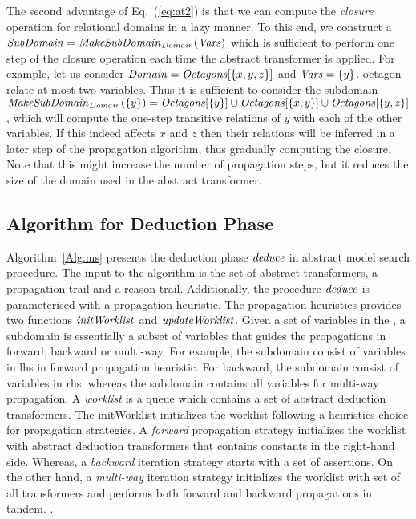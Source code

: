 The second advantage of Eq.~(\ref{eq:at2}) is that we can compute the
\emph{closure} operation for relational domains in a lazy manner. To
this end, we construct a $\mathit{SubDomain}=\mathit{MakeSubDomain}_{\mathit{Domain}}(\mathit{Vars})$
which is sufficient to perform one step of the closure operation each
time the abstract transformer is applied.
%
For example, let us consider $\mathit{Domain}=\mathit{Octagons}[\{x,y,z\}]$ and
$\mathit{Vars}=\{y\}$.  octagon  relate at 
most two variables. Thus it is sufficient to consider the subdomain
$\mathit{MakeSubDomain}_{\mathit{Domain}}(\{y\})=\mathit{Octagons}[\{y\}]\cup\mathit{Octagons}[\{x,y\}]\cup\mathit{Octagons}[\{y,z\}]$,
which will compute the one-step transitive relations of $y$ with each
of the other variables. If this indeed affects $x$ and $z$ then their
relations will be inferred in a later step of the propagation
algorithm, thus gradually computing the closure. Note that this might
increase the number of propagation steps, but it reduces the size of
the domain used in the abstract transformer.


\subsection{Algorithm for Deduction Phase}
%

Algorithm~\ref{Alg:ms} presents the deduction phase $\mathit{deduce}$ in 
abstract model search procedure.  The input to the algorithm is 
the set of abstract transformers, a propagation trail and a reason 
trail.  Additionally, the procedure $\mathit{deduce}$ is parameterised with 
a propagation heuristic.  The propagation heuristics provides two 
functions $\mathit{initWorklist}$ and $\mathit{updateWorklist}$.  Given a set of 
variables in the , a subdomain is essentially a 
subset of variables  that guides the propagations in forward, 
backward or multi-way.  For example, the subdomain consist of variables 
in lhs in forward propagation heuristic.  For backward, the subdomain 
consist of variables in rhs, whereas the subdomain contains all variables 
for multi-way propagation.  A {\em worklist} is a queue which contains 
a set of abstract deduction transformers.  
The initWorklist initializes the worklist 
following a heuristics choice for propagation strategies.  A {\em forward} 
propagation strategy initializes the worklist with abstract deduction 
transformers that contains constants in the right-hand side. Whereas, a 
{\em backward} iteration strategy starts with a set of assertions. On the 
other hand, a {\em multi-way} iteration strategy initializes the worklist 
with set of all transformers and performs both forward and backward 
propagations in tandem.  . 

